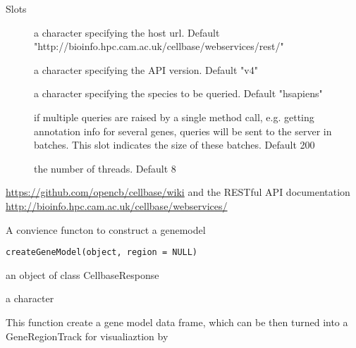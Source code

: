 \documentclass[letterpaper]{book}
\begin{document}
%
\begin{Section}{Slots}

\begin{description}

\item[] a character specifying the host url. Default 
"http://bioinfo.hpc.cam.ac.uk/cellbase/webservices/rest/"

\item[] a character specifying the API version. Default "v4"

\item[] a character specifying the species to be queried. Default
"hsapiens"

\item[] if multiple queries are raised by a single method call, e.g.
getting annotation info for several genes,
queries will be sent to the server in batches. This slot indicates the size 
of these batches. Default 200

\item[] the number of threads. Default 8

\end{description}
\end{Section}
%
\begin{SeeAlso}\relax
\url{https://github.com/opencb/cellbase/wiki} 
and the RESTful API documentation 
\url{http://bioinfo.hpc.cam.ac.uk/cellbase/webservices/}
\end{SeeAlso}
%
\begin{Description}\relax
A convience functon to construct a genemodel
\end{Description}
%
\begin{Usage}
\begin{verbatim}
createGeneModel(object, region = NULL)
\end{verbatim}
\end{Usage}
%
\begin{Arguments}
\begin{ldescription}
\item[\code{object}] an object of class CellbaseResponse

\item[\code{region}] a character
\end{ldescription}
\end{Arguments}
%
\begin{Details}\relax
This function create a gene model data frame, which can be then 
turned into a GeneRegionTrack for visualiaztion
by 
\end{Details}
\end{document}
